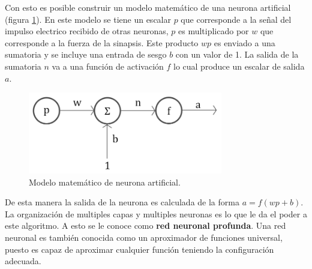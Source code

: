 \documentclass{article}
\begin{document}
Con esto es posible construir un modelo matemático de una neurona artificial (figura \ref{modelo}). En este modelo se tiene un escalar $p$ que corresponde a la señal del impulso electrico recibido de otras neuronas, $p$ es multiplicado por $w$ que corresponde a la fuerza de la sinapsis. 
Este producto $wp$ es enviado a una sumatoria y se incluye una entrada de sesgo $b$ con un valor de 1. La salida de la sumatoria $n$ va a una función de activación $f$ lo cual produce un escalar de salida $a$.
\begin{figure}[H]
    \centering
    \includegraphics[width=85mm]{model.png}
    \caption{Modelo matemático de neurona artificial.}
    \label{modelo}
\end{figure}
De esta manera la salida de la neurona es calculada de la forma $a = f(wp + b)$. \\
La organización de multiples capas y multiples neuronas es lo que le da el poder a este algoritmo. A esto se le conoce como \textbf{red neuronal profunda}. 
Una red neuronal es también conocida como un aproximador de funciones universal, puesto es capaz de aproximar cualquier función teniendo la configuración adecuada.\\
\end{document}

